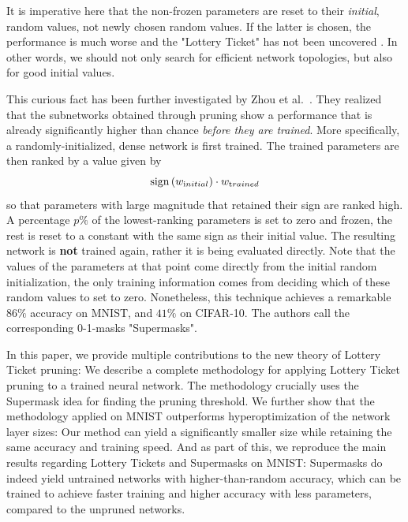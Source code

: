 \documentclass[12pt,final,twoside]{article}
\theoremstyle{plain}
\theoremstyle{definition}
\theoremstyle{remark}
\theoremstyle{named}
\begin{document}
It is imperative here that the non-frozen parameters are reset to their \textit{initial}, random values, not newly chosen random values. If the latter is chosen, the performance is much worse and the "Lottery Ticket" has not been uncovered \cite{lottery}. In other words, we should not only search for efficient network topologies, but also for good initial values.

This curious fact has been further investigated by Zhou et al.\ \cite{supermask}. They realized that the subnetworks obtained through pruning show a performance that is already significantly higher than chance \textit{before they are trained}. More specifically, a randomly-initialized, dense network is first trained. The trained parameters are then ranked by a value given by
$$
\operatorname{sign}\left(w_{\text initial}\right) \cdot w_{\text trained}
$$
so that parameters with large magnitude that retained their sign are ranked high. A percentage $p\%$ of the lowest-ranking parameters is set to zero and frozen, the rest is reset to a constant with the same sign as their initial value. The resulting network is \textbf{not} trained again, rather it is being evaluated directly. Note that the values of the parameters at that point come directly from the initial random initialization, the only training information comes from deciding which of these random values to set to zero. Nonetheless, this technique achieves a remarkable $86\%$ accuracy on MNIST, and $41\%$ on CIFAR-10. The authors call the corresponding 0-1-masks "Supermasks".

In this paper, we provide multiple contributions to the new theory of Lottery Ticket pruning: We describe a complete methodology for applying Lottery Ticket pruning to a trained neural network. The methodology crucially uses the Supermask idea for finding the pruning threshold. We further show that the methodology applied on MNIST outperforms hyperoptimization of the network layer sizes: Our method can yield a significantly smaller size while retaining the same accuracy and training speed. And as part of this, we reproduce the main results regarding Lottery Tickets \cite{lottery} and Supermasks \cite{supermask} on MNIST: Supermasks do indeed yield untrained networks with higher-than-random accuracy, which can be trained to achieve faster training and higher accuracy with less parameters, compared to the unpruned networks.

\end{document}
